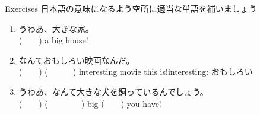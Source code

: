 \documentclass[aspectratio=169,xcolor={dvipsnames,table}]{beamer}
\begin{document}
\begin{frame}[plain]{Exercises}
日本語の意味になるよう空所に適当な単語を補いましょう
 \begin{enumerate}
  \item うわあ、大きな家。\\
	(~~~~) a big house!
  \item なんておもしろい映画なんだ。\\
	(~~~~) (~~~~~~) interesting movie this is!\hfill{\scriptsize interesting: おもしろい}
  \item うわあ、なんて大きな犬を飼っているんでしょう。\\
	(~~~~) (~~~~~~~~) big (~~~~) you have!
 \end{enumerate}
\hfill{}

\end{frame}
\end{document}
